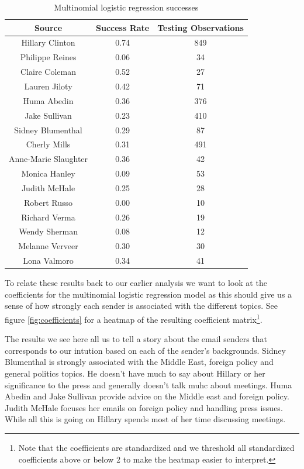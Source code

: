 \documentclass[12pt]{article}
\theoremstyle{definition}
\theoremstyle{algodesc}
\begin{document}
\begin{table}[h]
\centering
\begin{tabular}{ccc}
\toprule
Source & Success Rate & Testing Observations \\
\midrule
Hillary Clinton & 0.74 & 849 \\
Philippe Reines & 0.06 & 34 \\
Claire Coleman & 0.52 & 27 \\
Lauren Jiloty & 0.42 & 71 \\
Huma Abedin & 0.36 & 376 \\
Jake Sullivan & 0.23 & 410 \\
Sidney Blumenthal & 0.29 & 87 \\
Cherly Mills & 0.31 & 491 \\
Anne-Marie Slaughter & 0.36 & 42 \\
Monica Hanley & 0.09 & 53 \\
Judith McHale & 0.25 & 28 \\
Robert Russo & 0.00 & 10 \\
Richard Verma & 0.26 & 19 \\
Wendy Sherman & 0.08 & 12 \\
Melanne Verveer & 0.30 & 30 \\
Lona Valmoro & 0.34 & 41 \\
\bottomrule
\end{tabular}
\caption{Multinomial logistic regression successes}
\label{tab:mlr_success}
\end{table}

To relate these results back to our earlier analysis we want to look at the coefficients for the multinomial logistic regression model as this should give us a sense of how strongly each sender is associated with the different topics.  See figure \ref{fig:coefficients} for a heatmap of the resulting coefficient matrix\footnote{Note that the coefficients are standardized and we threshold all standardized coefficients above or below 2 to make the heatmap easier to interpret.}.

The results we see here all us to tell a story about the email senders that corresponds to our intution based on each of the sender's backgrounds.  Sidney Blumenthal is strongly associated with the Middle East, foreign policy and general politics topics.  He doesn't have much to say about Hillary or her significance to the press and generally doesn't talk muhc about meetings.  Huma Abedin and Jake Sullivan provide advice on the Middle east and foreign policy.  Judith McHale focuses her emails on foreign policy and handling press issues.  While all this is going on Hillary spends most of her time discussing meetings.
\end{document}
